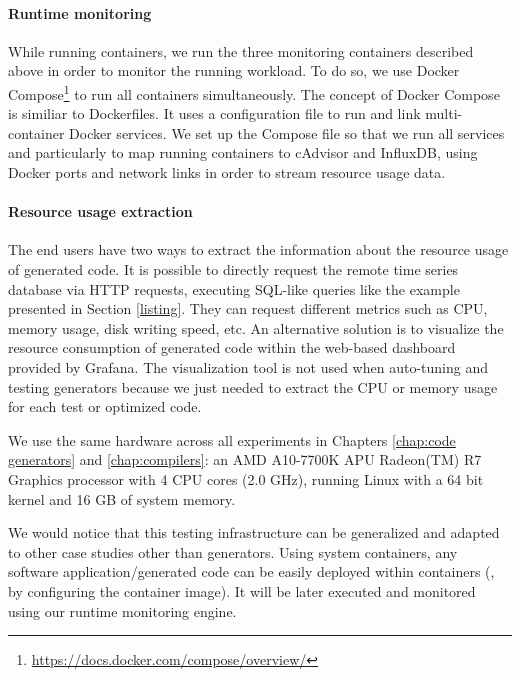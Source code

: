 \paragraph{Runtime monitoring}
While running containers, we run the three monitoring containers described above in order to monitor the running workload. To do so, we use Docker Compose\footnote{\url{https://docs.docker.com/compose/overview/}} to run all containers simultaneously. The concept of Docker Compose is similiar to Dockerfiles. It uses a configuration file to run and link multi-container Docker services. We set up the Compose file so that we run all services and particularly to map running containers to cAdvisor and InfluxDB, using Docker ports and network links in order to stream resource usage data.

\paragraph{Resource usage extraction}
The end users have two ways to extract the information about the resource usage of generated code. It is possible to directly request the remote time series database via HTTP requests, executing SQL-like queries like the example presented in Section \ref{listing}. They can request different metrics such as CPU, memory usage, disk writing speed, etc. An alternative solution is to visualize the resource consumption of generated code within the web-based dashboard provided by Grafana. The visualization tool is not used when auto-tuning and testing generators because we just needed to extract the CPU or memory usage for each test or optimized code. 

We use the same hardware across all experiments in Chapters \ref{chap:code generators} and \ref{chap:compilers}: an AMD A10-7700K APU Radeon(TM) R7 Graphics processor with 4 CPU cores (2.0 GHz), running Linux with a 64 bit kernel and 16 GB of system memory.	



\begin{remark}
	We would notice that this testing infrastructure can be generalized and adapted to other case studies other than generators. Using system containers, any software application/generated code can be easily deployed within containers (\ie, by configuring the container image). It will be later executed and monitored using our runtime monitoring engine. 
\end{remark}

